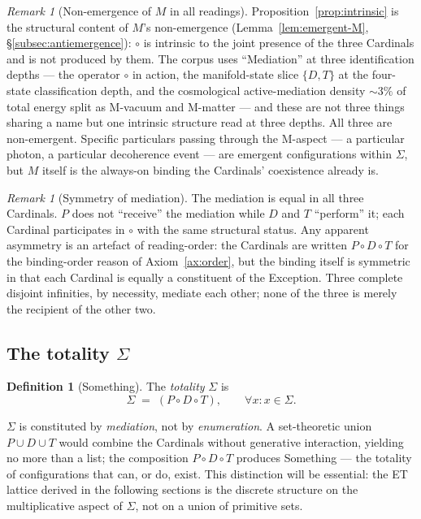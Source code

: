 \documentclass[11pt,a4paper]{article}
\theoremstyle{definition}
\newtheorem{definition}[theorem]{Definition}
\theoremstyle{remark}
\newtheorem{remark}[theorem]{Remark}
\begin{document}
\begin{remark}[Non-emergence of $M$ in all readings]\label{rem:M-nonemergent}
Proposition~\ref{prop:intrinsic} is the structural content of $M$'s non-emergence (Lemma~\ref{lem:emergent-M}, \S\ref{subsec:antiemergence}): $\circ$ is intrinsic to the joint presence of the three Cardinals and is not produced by them. The corpus uses ``Mediation'' at three identification depths --- the operator $\circ$ in action, the manifold-state slice $\{D,T\}$ at the four-state classification depth, and the cosmological active-mediation density $\sim 3\%$ of total energy split as M-vacuum and M-matter --- and these are not three things sharing a name but one intrinsic structure read at three depths. All three are non-emergent. Specific particulars passing through the M-aspect ---  a particular photon, a particular decoherence event --- are emergent configurations within $\Sigma$, but $M$ itself is the always-on binding the Cardinals' coexistence already is.
\end{remark}

\begin{remark}[Symmetry of mediation]\label{rem:mediation-symmetry}
The mediation is equal in all three Cardinals. $P$ does not ``receive'' the mediation while $D$ and $T$ ``perform'' it; each Cardinal participates in $\circ$ with the same structural status. Any apparent asymmetry is an artefact of reading-order: the Cardinals are written $P \circ D \circ T$ for the binding-order reason of Axiom~\ref{ax:order}, but the binding itself is symmetric in that each Cardinal is equally a constituent of the Exception. Three complete disjoint infinities, by necessity, mediate each other; none of the three is merely the recipient of the other two.
\end{remark}

\subsection{The totality $\Sigma$}\label{subsec:Sigma}

\begin{definition}[Something]\label{def:Sigma}
The \emph{totality} $\Sigma$ is
\[
\Sigma \;=\; (P \circ D \circ T), \qquad \forall x: x \in \Sigma.
\]
\end{definition}

$\Sigma$ is constituted by \emph{mediation}, not by \emph{enumeration}. A set-theoretic union $P \cup D \cup T$ would combine the Cardinals without generative interaction, yielding no more than a list; the composition $P \circ D \circ T$ produces Something --- the totality of configurations that can, or do, exist. This distinction will be essential: the ET lattice derived in the following sections is the discrete structure on the multiplicative aspect of $\Sigma$, not on a union of primitive sets.
\end{document}
